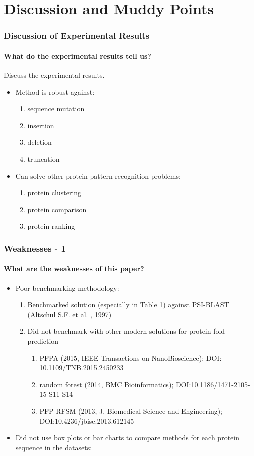 \documentclass[xcolor={usenames,dvipsnames},hyperref={hyperindex,bookmarks}]{beamer}
\begin{document}

\section{Discussion and Muddy Points}


\frame
{
	\frametitle{Discussion of Experimental Results}
	\framesubtitle{What do the experimental results tell us?}

	Discuss the experimental results.
	\begin{itemize}
	\item Method is robust against: 
		\begin{enumerate} 
		\item sequence mutation
		\item insertion
		\item deletion
		\item truncation
		\end{enumerate}
	\item Can solve other protein pattern recognition problems:
		\begin{enumerate} 
		\item protein clustering
		\item protein comparison
		\item protein ranking
		\end{enumerate}
	\end{itemize}

}


\frame
{
	\frametitle{Weaknesses - 1}
	\framesubtitle{What are the weaknesses of this paper?}

	\begin{itemize}
	\item Poor benchmarking methodology: 
		\begin{enumerate} 
		\item Benchmarked solution (especially in Table 1) against PSI-BLAST (Altschul S.F. et al. , 1997)
		\item Did not benchmark with other modern solutions for protein fold prediction
			\begin{enumerate} 
			\item PFPA (2015, IEEE Transactions on NanoBioscience); DOI: 10.1109/TNB.2015.2450233
			\item random forest (2014, BMC Bioinformatics); DOI:10.1186/1471-2105-15-S11-S14
			\item PFP-RFSM (2013, J. Biomedical Science and Engineering); DOI:10.4236/jbise.2013.612145 
			\end{enumerate}
		\end{enumerate}
	\item Did not use box plots or bar charts to compare methods for each protein sequence in the datasets:
	\end{itemize}
}
\end{document}

